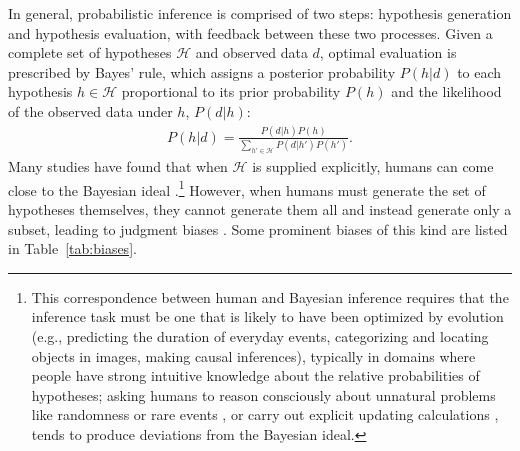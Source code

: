 In general, probabilistic inference is comprised of two steps: hypothesis generation and hypothesis evaluation, with feedback between these two processes. Given a complete set of hypotheses $\mathcal{H}$ and observed data $d$, optimal evaluation is prescribed by Bayes' rule, which assigns a posterior probability $P(h|d)$ to each hypothesis $h \in \mathcal{H}$ proportional to its prior probability $P(h)$ and the likelihood of the observed data under $h$, $P(d|h)$:
\begin{align}
P(h|d) = \frac{P(d|h) P(h)}{\sum_{h' \in \mathcal{H}} P(d|h') P(h')}.
\end{align}
Many studies have found that when $\mathcal{H}$ is supplied explicitly, humans can come close to the Bayesian ideal \citep[e.g.,][]{griffiths2006,griffiths2011,frank2012,petzschner2015,oaksford2007}.\footnote{This correspondence between human and Bayesian inference requires that the inference task must be one that is likely to have been optimized by evolution (e.g., predicting the duration of everyday events, categorizing and locating objects in images, making causal inferences), typically in domains where people have strong intuitive knowledge about the relative probabilities of hypotheses; asking humans to reason consciously about unnatural problems like randomness or rare events \citep[see][for discussion]{chater2006}, or carry out explicit updating calculations \citep{peterson1967man}, tends to produce deviations from the Bayesian ideal.} However, when humans must generate the set of hypotheses themselves, they cannot generate them all and instead generate only a subset, leading to judgment biases \citep{Thomas2008,Dougherty2003,carroll2015,koriat1980,weber1993,Gettys1979}. Some prominent biases of this kind are listed in Table~\ref{tab:biases}.
